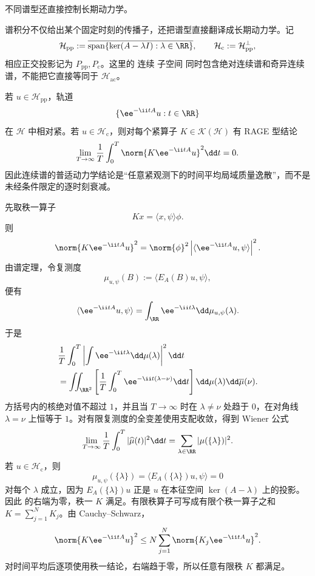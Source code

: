 不同谱型还直接控制长期动力学。

谱积分不仅给出某个固定时刻的传播子，还把谱型直接翻译成长期动力学。记
\[
 \mathcal H_{\mathrm{pp}}
 :=\overline{\operatorname{span}\{\ker(A-\lambda I):\lambda\in\RR\}},
 \qquad
 \mathcal H_{\mathrm c}:=\mathcal H_{\mathrm{pp}}^{\perp},
\]
相应正交投影记为 $P_{\mathrm{pp}},P_{\mathrm c}$。这里的 连续 子空间 同时包含绝对连续谱和奇异连续谱，不能把它直接等同于 $\mathcal H_{\mathrm{ac}}$。

若 $u\in\mathcal H_{\mathrm{pp}}$，轨道
\[
 \{\ee^{-\ii tA}u:t\in\RR\}
\]
在 $\mathcal H$ 中相对紧。若 $u\in\mathcal H_{\mathrm c}$，则对每个紧算子 $K\in\mathcal K(\mathcal H)$ 有 RAGE 型结论
\begin{equation}\label{eq:math-sl-rage-cesaro}
 \lim_{T\to\infty}\frac1T\int_0^T
 \norm{K\ee^{-\ii tA}u}^2\dd t=0.
\end{equation}
因此连续谱的普适动力学结论是“任意紧观测下的时间平均局域质量逸散”，而不是未经条件限定的逐时刻衰减。

先取秩一算子
\[
 Kx=\langle x,\psi\rangle\phi.
\]
则
\[
 \norm{K\ee^{-\ii tA}u}^2
 =\norm{\phi}^2
 \left|\langle\ee^{-\ii tA}u,\psi\rangle\right|^2.
\]
由谱定理，令复测度
\[
 \mu_{u,\psi}(B):=\langle E_A(B)u,\psi\rangle,
\]
便有
\[
 \langle\ee^{-\ii tA}u,\psi\rangle
 =\int_{\RR}\ee^{-\ii t\lambda}\dd\mu_{u,\psi}(\lambda).
\]
于是
\[
\begin{aligned}
 &\frac1T\int_0^T
 \left|\int\ee^{-\ii t\lambda}\dd\mu(\lambda)\right|^2\dd t\\
 &=\iint_{\RR^2}
 \left[\frac1T\int_0^T\ee^{-\ii t(\lambda-\nu)}\dd t\right]
 \dd\mu(\lambda)\dd\overline\mu(\nu).
\end{aligned}
\]
方括号内的核绝对值不超过 $1$，并且当 $T\to\infty$ 时在 $\lambda\ne\nu$ 处趋于 $0$，在对角线 $\lambda=\nu$ 上恒等于 $1$。对有限复测度的全变差使用支配收敛，得到 Wiener 公式
\begin{equation}\label{eq:math-sl-wiener-atoms}
 \lim_{T\to\infty}\frac1T\int_0^T
 |\widehat\mu(t)|^2\dd t
 =\sum_{\lambda\in\RR}|\mu(\{\lambda\})|^2.
\end{equation}
若 $u\in\mathcal H_{\mathrm c}$，则
\[
 \mu_{u,\psi}(\{\lambda\})
 =\langle E_A(\{\lambda\})u,\psi\rangle=0
\]
对每个 $\lambda$ 成立，因为 $E_A(\{\lambda\})u$ 正是 $u$ 在本征空间 $\ker(A-\lambda)$ 上的投影。因此 的右端为零，秩一 $K$ 满足。有限秩算子可写成有限个秩一算子之和 $K=\sum_{j=1}^N K_j$。由 Cauchy--Schwarz，
\[
 \norm{K\ee^{-\ii tA}u}^2
 \le N\sum_{j=1}^N
 \norm{K_j\ee^{-\ii tA}u}^2.
\]
对时间平均后逐项使用秩一结论，右端趋于零，所以任意有限秩 $K$ 都满足。

